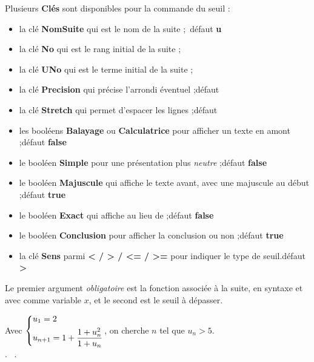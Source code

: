 \documentclass[a4paper,french,11pt]{article}
\newcommand\ctex[1]{\tcbox[vignettelatex]{#1}}
\newcommand\Cle[1]{{\bfseries\sffamily\textlangle #1\textrangle}}
\begin{document}
\begin{codecles}
Plusieurs \Cle{Clés} sont disponibles pour la commande du seuil :

\begin{itemize}
	\item la clé \Cle{NomSuite} qui est le nom de la suite ;\hfill~défaut \Cle{u}
	\item la clé \Cle{No} qui est le rang initial de la suite ;
	\item la clé \Cle{UNo} qui est le terme initial de la suite ;
	\item la clé \Cle{Precision} qui précise l'arrondi éventuel ;\hfill{}défaut \Cle{2}
	\item la clé \Cle{Stretch} qui permet d'espacer les lignes ;\hfill{}défaut \Cle{1.15}
	\item les booléens \Cle{Balayage} ou \Cle{Calculatrice} pour afficher un texte en amont ;\hfill{}défaut \Cle{false}
	\item le booléen \Cle{Simple} pour une présentation plus \textit{neutre} ;\hfill{}défaut \Cle{false}
	\item le booléen \Cle{Majuscule} qui affiche le texte avant, avec une majuscule au début ;\hfill{}défaut \Cle{true}
	\item le booléen \Cle{Exact} qui affiche \ctex{=} au lieu de \ctex{\textbackslash approx} ;\hfill{}défaut \Cle{false}
	\item le booléen \Cle{Conclusion} pour afficher la conclusion ou non ;\hfill{}défaut \Cle{true}
	\item la clé \Cle{Sens} parmi \Cle{< / > / <= / >=} pour indiquer le type de seuil.\hfill{}défaut \Cle{>}
\end{itemize}

\smallskip

Le premier argument \textit{obligatoire} est la fonction associée à la suite, en syntaxe \ctex{xint} et avec comme variable $x$, et le second est le seuil à dépasser.
\end{codecles}

\begin{codetex}[]
Avec $\begin{dcases} u_1 = 2 \\ u_{n+1}=1+\dfrac{1+u_n^2}{1+u_n} \end{dcases}$,
on cherche $n$ tel que $u_n > 5$.\\
.
~.\\
\end{codetex}
\end{document}
